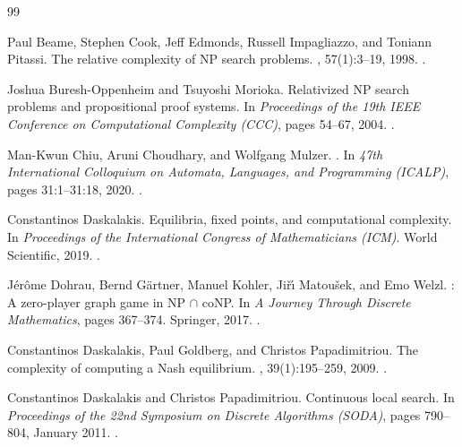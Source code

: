 \newcommand{\etalchar}[1]{$^{#1}$}
\begin{thebibliography}{99}

Paul Beame, Stephen Cook, Jeff Edmonds, Russell Impagliazzo, and Toniann
  Pitassi.
\newblock The relative complexity of {NP} search problems.
, 57(1):3--19, 1998.
\newblock \href {https://doi.org/10.1006/jcss.1998.1575}
  {}.

Joshua Buresh{-}Oppenheim and Tsuyoshi Morioka.
\newblock Relativized {NP} search problems and propositional proof systems.
\newblock In {\em Proceedings of the 19th IEEE Conference on Computational
  Complexity (CCC)}, pages 54--67, 2004.
\newblock \href {https://doi.org/10.1109/CCC.2004.1313795}
  {}.

Man-Kwun Chiu, Aruni Choudhary, and Wolfgang Mulzer.
.
\newblock In {\em 47th International Colloquium on Automata, Languages, and
  Programming (ICALP)}, pages 31:1--31:18, 2020.
\newblock \href {https://doi.org/10.4230/LIPIcs.ICALP.2020.31}
  {}.

Constantinos Daskalakis.
\newblock Equilibria, fixed points, and computational complexity.
\newblock In {\em Proceedings of the International Congress of Mathematicians
  (ICM)}. World Scientific, 2019.
\newblock \href {https://doi.org/10.1142/9789813272880_0009}
  {}.

J{\'{e}}r{\^{o}}me Dohrau, Bernd G\"artner, Manuel Kohler, Ji{\v{r}}{\'{\i}}
  Matou{\v{s}}ek, and Emo Welzl.
: A zero-player graph game in {NP} $\cap$ {coNP}.
\newblock In {\em A Journey Through Discrete Mathematics}, pages 367--374.
  Springer, 2017.
\newblock \href {https://doi.org/10.1007/978-3-319-44479-6_14}
  {}.

Constantinos Daskalakis, Paul Goldberg, and Christos Papadimitriou.
\newblock The complexity of computing a {N}ash equilibrium.
, 39(1):195--259, 2009.
\newblock \href {https://doi.org/10.1137/070699652}
  {}.

Constantinos Daskalakis and Christos Papadimitriou.
\newblock Continuous local search.
\newblock In {\em Proceedings of the 22nd Symposium on Discrete Algorithms
  (SODA)}, pages 790--804, January 2011.
\newblock \href {https://doi.org/10.1137/1.9781611973082.62}
  {}.


\end{thebibliography}

